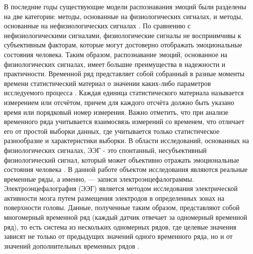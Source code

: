 \documentclass{article}
\begin{document}
В последние годы существующие модели распознавания эмоций были разделены на две категории: методы, основанные на физиологических сигналах, и методы, основанные на нефизиологических сигналах \citep{sensors18}. По сравнению с нефизиологическими сигналами, физиологические сигналы не восприимчивы к субъективным факторам, которые могут достоверно отображать эмоциональные состояния человека. Таким образом, распознавание эмоций, основанное на физиологических сигналах, имеет большие преимущества в надежности и практичности\citep{sensors}. Временной ряд представляет собой собранный в разные моменты времени статистический материал о значении каких-либо параметров исследуемого процесса \citep{time_series}. Каждая единица статистического материала называется измерением или отсчётом, причем для каждого отсчёта должно быть указано время или порядковый номер измерения. Важно отметить, что при анализе временного ряда учитывается взаимосвязь измерений со временем, что отличает его от простой выборки данных, где учитывается только статистическое разнообразие и характеристики выборки. В области исследований, основанных на физиологических сигналах, ЭЭГ - это спонтанный, несубъективный физиологический сигнал, который может объективно отражать эмоциональные состояния человека \citep{eeg}. В данной работе объектом исследования являются реальные временные ряды, а именно, — записи электроэнцефалограммы. Электроэнцефалография (ЭЭГ) является методом исследования электрической активности мозга путем размещения электродов в определенных зонах на поверхности головы. Данные, полученные таким образом, представляют собой многомерный временной ряд (каждый датчик отвечает за одномерный временной ряд), то есть система из нескольких одномерных рядов, где целевые значения зависят не только от предыдущих значений одного временного ряда, но и от значений дополнительных временных рядов \citep{seed}.
\end{document}
